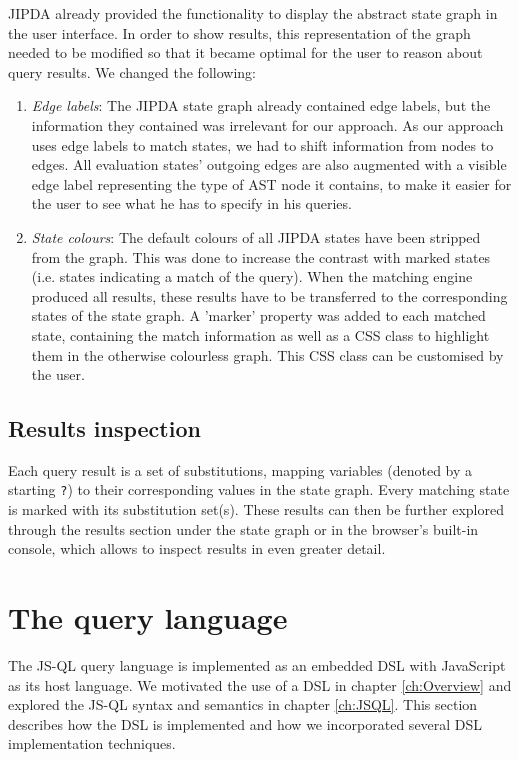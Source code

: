 JIPDA already provided the functionality to display the abstract state graph in the user interface. In order to show results, this representation of the graph needed to be modified so that it became optimal for the user to reason about query results. We changed the following:
\begin{enumerate}
\item \textit{Edge labels}: The JIPDA state graph already contained edge labels, but the information they contained was irrelevant for our approach. As our approach uses edge labels to match states, we had to shift information from nodes to edges. All evaluation states' outgoing edges are also augmented with a visible edge label representing the type of AST node it contains, to make it easier for the user to see what he has to specify in his queries.
\item \textit{State colours}: The default colours of all JIPDA states have been stripped from the graph. This was done to increase the contrast with marked states (i.e. states indicating a match of the query). When the matching engine produced all results, these results have to be transferred to the corresponding states of the state graph. A 'marker' property was added to each matched state, containing the match information as well as a CSS class to highlight them in the otherwise colourless graph. This CSS class can be customised by the user.
\end{enumerate}

\subsection*{Results inspection}

Each query result is a set of substitutions, mapping variables (denoted by a starting \texttt{?}) to their corresponding values in the state graph. Every matching state is marked with its substitution set(s). These results can then be further explored through the results section under the state graph or in the browser's built-in console, which allows to inspect results in even greater detail.


\section{The query language}
The JS-QL query language is implemented as an embedded DSL with JavaScript as its host language. We motivated the use of a DSL in chapter \ref{ch:Overview} and explored the JS-QL syntax and semantics in chapter \ref{ch:JSQL}. This section describes how the DSL is implemented and how we incorporated several DSL implementation techniques.

